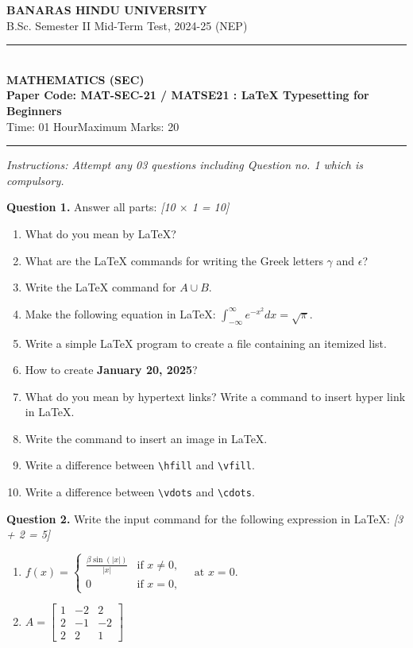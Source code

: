 \documentclass[11pt,a4paper]{article}
\newcommand{\pts}[1]{\hfill \textit{[#1]}}
\begin{document}
\begin{center}
  {\large\bfseries BANARAS HINDU UNIVERSITY}\\[2pt]
  {\normalsize B.Sc. Semester II Mid-Term Test, 2024-25 (NEP)}\\[6pt]
  \rule{0.8\linewidth}{0.5pt}\\[6pt]
  {\large\bfseries MATHEMATICS (SEC)}\\[4pt]
  {\large\bfseries Paper Code: MAT-SEC-21 / MATSE21 : \LaTeX{} Typesetting for Beginners}\\[4pt]
  {\normalsize Time: 01 Hour\hfill Maximum Marks: 20}
\end{center}

\rule{\linewidth}{0.4pt}

\smallskip

\noindent \textit{Instructions: Attempt any 03 questions including Question no. 1 which is compulsory.}

\bigskip

\noindent \textbf{Question 1.} Answer all parts: \pts{10 $\times$ 1 = 10}
\begin{enumerate}[label=(\alph*)]
  \item What do you mean by \LaTeX?
  \item What are the \LaTeX{} commands for writing the Greek letters $\gamma$ and $\epsilon$?
  \item Write the \LaTeX{} command for $A \cup B$.
  \item Make the following equation in \LaTeX: $\int_{-\infty}^{\infty} e^{-x^2} dx = \sqrt{\pi}$.
  \item Write a simple \LaTeX{} program to create a file containing an itemized list.
  \item How to create \textbf{January 20, 2025}?
  \item What do you mean by hypertext links? Write a command to insert hyper link in \LaTeX.
  \item Write the command to insert an image in \LaTeX.
  \item Write a difference between \texttt{\textbackslash hfill} and \texttt{\textbackslash vfill}.
  \item Write a difference between \texttt{\textbackslash vdots} and \texttt{\textbackslash cdots}.
\end{enumerate}

\bigskip

\noindent \textbf{Question 2.} Write the input command for the following expression in \LaTeX: \pts{3 + 2 = 5}
\begin{enumerate}[label=(\alph*)]
  \item $f(x) = \begin{cases} \frac{\beta \sin(|x|)}{|x|} & \text{if } x \neq 0, \\ 0 & \text{if } x = 0, \end{cases} \quad \text{at } x=0$.
  \item $A = \begin{bmatrix} 1 & -2 & 2 \\ 2 & -1 & -2 \\ 2 & 2 & 1 \end{bmatrix}$
\end{enumerate}
\end{document}
